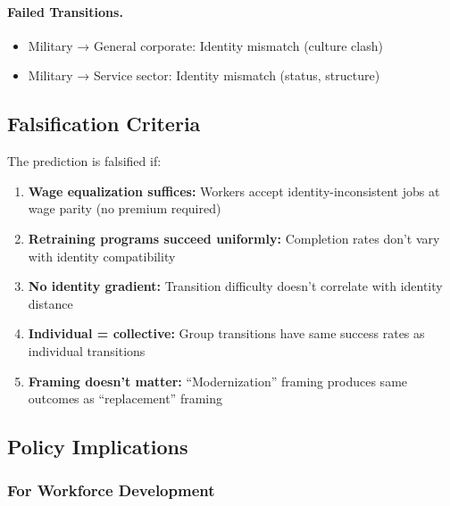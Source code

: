 \paragraph{Failed Transitions.}
\begin{itemize}
    \item Military → General corporate: Identity mismatch (culture clash)
    \item Military → Service sector: Identity mismatch (status, structure)
\end{itemize}

\subsection{Falsification Criteria}

The prediction is falsified if:

\begin{enumerate}
    \item \textbf{Wage equalization suffices:} Workers accept identity-inconsistent 
    jobs at wage parity (no premium required)
    
    \item \textbf{Retraining programs succeed uniformly:} Completion rates 
    don't vary with identity compatibility
    
    \item \textbf{No identity gradient:} Transition difficulty doesn't correlate 
    with identity distance
    
    \item \textbf{Individual = collective:} Group transitions have same success 
    rates as individual transitions
    
    \item \textbf{Framing doesn't matter:} ``Modernization'' framing produces 
    same outcomes as ``replacement'' framing
\end{enumerate}

\subsection{Policy Implications}

\subsubsection{For Workforce Development}


